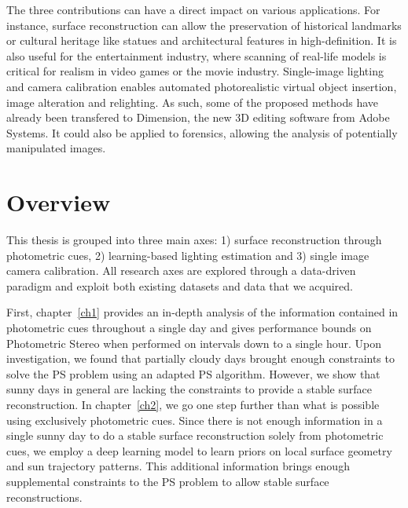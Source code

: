 The three contributions can have a direct impact on various applications. For instance, surface reconstruction can allow the preservation of historical landmarks or cultural heritage like statues and architectural features in high-definition. It is also useful for the entertainment industry, where scanning of real-life models is critical for realism in video games or the movie industry. Single-image lighting and camera calibration enables automated photorealistic virtual object insertion, image alteration and relighting. As such, some of the proposed methods have already been transfered to Dimension, the new 3D editing software from Adobe Systems. It could also be applied to forensics, allowing the analysis of potentially manipulated images. 

\section*{Overview}

This thesis is grouped into three main axes: 1) surface reconstruction through photometric cues, 2) learning-based lighting estimation and 3) single image camera calibration. All research axes are explored through a data-driven paradigm and exploit both existing datasets and data that we acquired. 

First, chapter~\ref{ch1} provides an in-depth analysis of the information contained in photometric cues throughout a single day and gives performance bounds on Photometric Stereo when performed on intervals down to a single hour. Upon investigation, we found that partially cloudy days brought enough constraints to solve the PS problem using an adapted PS algorithm. However, we show that sunny days in general are lacking the constraints to provide a stable surface reconstruction. In chapter~\ref{ch2}, we go one step further than what is possible using exclusively photometric cues. Since there is not enough information in a single sunny day to do a stable surface reconstruction solely from photometric cues, we employ a deep learning model to learn priors on local surface geometry and sun trajectory patterns. This additional information brings enough supplemental constraints to the PS problem to allow stable surface reconstructions. 

